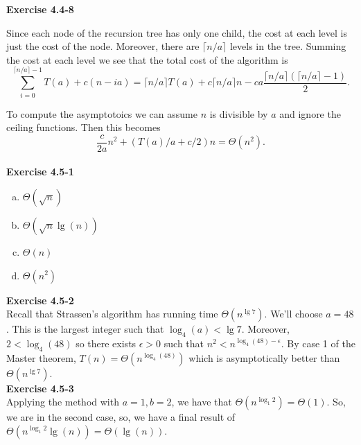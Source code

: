 \documentclass{article}
\begin{document}
\noindent\textbf{Exercise 4.4-8}\\


Since each node of the recursion tree has only one child, the cost at each level is just the cost of the node.  Moreover, there are $\lceil n/a \rceil$ levels in the tree.  Summing the cost at each level we see that the total cost of the algorithm is 
\[ \sum_{i=0}^{\lceil n/a \rceil - 1} T(a) + c(n-ia) = \lceil n/a \rceil T(a) + c\lceil n/a \rceil n - ca \frac{\lceil n/a \rceil(\lceil n/a \rceil - 1)}{2}.\]

To compute the asymptotoics we can assume $n$ is divisible by $a$ and ignore the ceiling functions.  Then this becomes
\[ \frac{c}{2a}n^2 + (T(a)/a + c/2)n = \Theta(n^2).\]\\


\noindent\textbf{Exercise 4.5-1}\\

\begin{enumerate}[a)]
\item
$\Theta(\sqrt{n})$
\item
$\Theta(\sqrt{n}\lg(n))$
\item
$\Theta(n)$
\item
$\Theta(n^2)$
\end{enumerate}

\noindent\textbf{Exercise 4.5-2}\\

Recall that Strassen's algorithm has running time $\Theta(n^{\lg 7})$.  We'll choose $a = 48$.  This is the largest integer such that $\log_4(a) < \lg 7$.  Moreover, $2 < \log_4(48)$ so there exists $\epsilon > 0$ such that $n^2 < n^{\log_4(48) - \epsilon}$.  By case 1 of the Master theorem, $T(n) = \Theta(n^{\log_4(48)})$ which is asymptotically better than $\Theta(n^{\lg 7})$. \\

\noindent\textbf{Exercise 4.5-3}\\

Applying the method with $a=1,b=2$, we have that $\Theta(n^{\log_1 2}) = \Theta(1)$. So, we are in the second case, so, we have a final result of $\Theta(n^{\log_1 2}\lg(n)) = \Theta(\lg(n))$.\\
\end{document}
